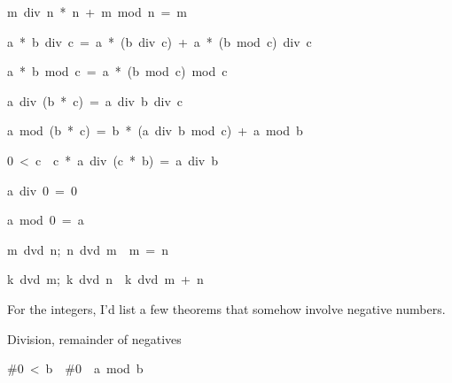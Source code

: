 \begin{isabelle}
\begin{isamarkuptext}
\begin{isabelle}
m\ div\ n\ *\ n\ +\ m\ mod\ n\ =\ m%
\end{isabelle}


\begin{isabelle}
a\ *\ b\ div\ c\ =\ a\ *\ (b\ div\ c)\ +\ a\ *\ (b\ mod\ c)\ div\ c%
\end{isabelle}

\begin{isabelle}
a\ *\ b\ mod\ c\ =\ a\ *\ (b\ mod\ c)\ mod\ c%
\end{isabelle}

\begin{isabelle}
a\ div\ (b\ *\ c)\ =\ a\ div\ b\ div\ c%
\end{isabelle}

\begin{isabelle}
a\ mod\ (b\ *\ c)\ =\ b\ *\ (a\ div\ b\ mod\ c)\ +\ a\ mod\ b%
\end{isabelle}

\begin{isabelle}
0\ <\ c\ \isasymLongrightarrow \ c\ *\ a\ div\ (c\ *\ b)\ =\ a\ div\ b%
\end{isabelle}

\begin{isabelle}
a\ div\ 0\ =\ 0
\end{isabelle}

\begin{isabelle}
a\ mod\ 0\ =\ a%
\end{isabelle}

\begin{isabelle}
\isasymlbrakk m\ dvd\ n;\ n\ dvd\ m\isasymrbrakk \ \isasymLongrightarrow \ m\ =\ n%
\end{isabelle}

\begin{isabelle}
\isasymlbrakk k\ dvd\ m;\ k\ dvd\ n\isasymrbrakk \ \isasymLongrightarrow \ k\ dvd\ m\ +\ n%
\end{isabelle}

For the integers, I'd list a few theorems that somehow involve negative 
numbers.  

Division, remainder of negatives


\begin{isabelle}
\#0\ <\ b\ \isasymLongrightarrow \ \#0\ \isasymle \ a\ mod\ b%
\end{isabelle}


\end{isamarkuptext}
\end{isabelle}
